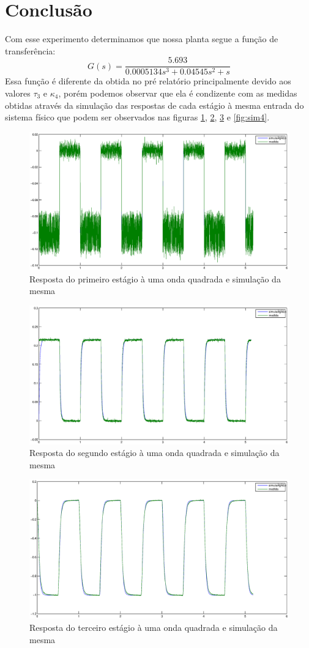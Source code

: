 \documentclass{article}
\begin{document}
\section{Conclusão}
Com esse experimento determinamos que nossa planta segue a função de transferência:
\begin{equation}
\label{eq:gs}
G(s) = \frac{5.693}{0.0005134 s^3 + 0.04545 s^2 + s}
\end{equation} 
Essa função é diferente da obtida no pré relatório principalmente devido aos valores $\tau_3$ e $\kappa_4$, porém podemos observar que ela é condizente com as medidas obtidas através da simulação das respostas de cada estágio à mesma entrada do sistema físico que podem ser observados nas figuras \ref{fig:sim1}, \ref{fig:sim2}, \ref{fig:sim3} e \ref{fig:sim4}.
\begin{figure}[H]
	\centering
	\includegraphics[width=0.8\linewidth]{sim1}
	\caption{Resposta do primeiro estágio à uma onda quadrada e simulação da mesma}
	\label{fig:sim1}
\end{figure}
\begin{figure}[H]
	\centering
	\includegraphics[width=0.8\linewidth]{sim2}
	\caption{Resposta do segundo estágio à uma onda quadrada e simulação da mesma}
	\label{fig:sim2}
\end{figure}
\begin{figure}[H]
	\centering
	\includegraphics[width=0.8\linewidth]{sim3}
	\caption{Resposta do terceiro estágio à uma onda quadrada e simulação da mesma}
	\label{fig:sim3}
\end{figure}
\end{document}
